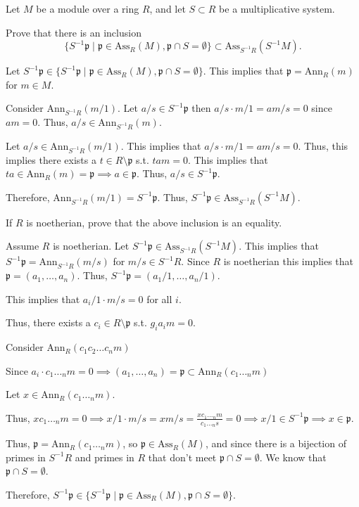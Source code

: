 \documentclass[12pt, letterpaper]{article}
\newcommand{\p}{\mathfrak{p}}
\begin{document}
\begin{problem}{}
    Let $M$ be a module over a ring $R$, and let $S \subset R$ be a multiplicative system.
\end{problem}

\begin{subproblem}{}
    Prove that there is an inclusion
\[\{S^{-1}\p \mid \p \in \mathrm{Ass}_R(M ), \p \cap S = \emptyset\} \subset \mathrm{Ass}_{S^{-1}R}(S^{-1}M ).\]
\end{subproblem}
\begin{problemproof}
    Let $S^{-1}\p \in \{S^{-1}\p \mid \p \in \mathrm{Ass}_R(M ), \p \cap S = \emptyset\}$. This implies that $\p = \mathrm{Ann}_R(m)$ for $m \in M$.

    Consider $\mathrm{Ann}_{S^{-1}R}(m/1)$. Let $a/s \in S^{-1}\p$ then $a/s \cdot m/1 = am/s = 0$ since $am = 0$. Thus, $a/s \in \mathrm{Ann}_{S^{-1}R}(m)$.

    Let $a/s \in \mathrm{Ann}_{S^{-1}R}(m/1)$. This implies that $a/s \cdot m/1=am/s=0$. Thus, this implies there exists a $t \in R \setminus \p$ s.t. $tam=0$. This implies that $ta \in \mathrm{Ann}_R(m)=\p \implies a \in \p$. Thus, $a/s \in S^{-1}\p$.

    Therefore, $\mathrm{Ann}_{S^{-1}R}(m/1)=S^{-1}\p$. Thus, $S^{-1}\p \in \mathrm{Ass}_{S^{-1}R}(S^{-1}M)$.
\end{problemproof}

\begin{subproblem}{}
    If $R$ is noetherian, prove that the above inclusion is an equality.
\end{subproblem}
\begin{problemproof}
    Assume $R$ is noetherian. Let $S^{-1}\p \in \mathrm{Ass}_{S^{-1}R}(S^{-1}M)$. This implies that $S^{-1}\p = \mathrm{Ann}_{S^{-1}R}(m/s)$ for $m/s \in S^{-1}R$. Since $R$ is noetherian this implies that $\p = (a_1,\dots,a_n)$. Thus, $S^{-1}\p=(a_1/1,\dots,a_n/1)$.

    This implies that $a_i/1 \cdot m/s = 0$ for all $i$.

    Thus, there exists a $c_i \in R \setminus \p$ s.t. $g_i a_i m = 0$.
    
    Consider $\mathrm{Ann}_{R}(c_1c_2\dots c_nm)$

    Since $a_i \cdot c_1\dotsc_nm = 0 \implies (a_1,\dots,a_n)=\p \subset \mathrm{Ann}_{R}(c_1\dotsc_nm)$

    Let $x \in \mathrm{Ann}_R(c_1\dotsc_nm)$.

    Thus, $xc_1\dotsc_nm=0 \implies  x/1 \cdot m/s = xm/s = \frac{xc_1\dotsc_nm}{c_1\dotsc_ns}=0 \implies x/1 \in S^{-1}\p \implies x \in \p$.

    Thus, $\p = \mathrm{Ann}_R(c_1\dotsc_nm)$, so $\p \in \mathrm{Ass}_R(M)$, and since there is a bijection of primes in $S^{-1}R$ and primes in $R$ that don't meet $\p \cap S = \emptyset$. We know that $\p \cap S = \emptyset$.

    Therefore, $S^{-1}\p \in \{S^{-1}\p \mid \p \in \mathrm{Ass}_R(M), \p \cap S = \emptyset\}$.
\end{problemproof}
\end{document}
